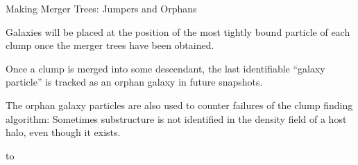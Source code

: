 %    
%    


\begin{frame}{Making Merger Trees: Jumpers and Orphans}
    
    Galaxies will be placed at the position of the most tightly bound particle of each clump once the merger trees have been obtained.
    
    Once a clump is merged into some descendant, the last identifiable ``galaxy particle'' is tracked as an orphan galaxy in future snapshots.
    
    The orphan galaxy particles are also used to counter failures of the clump finding algorithm: Sometimes substructure is not identified in the density field of a host halo, even though it exists.
    
\end{frame}


{
    {\vbox to }
    \begin{frame}[plain]
    \end{frame}
}



